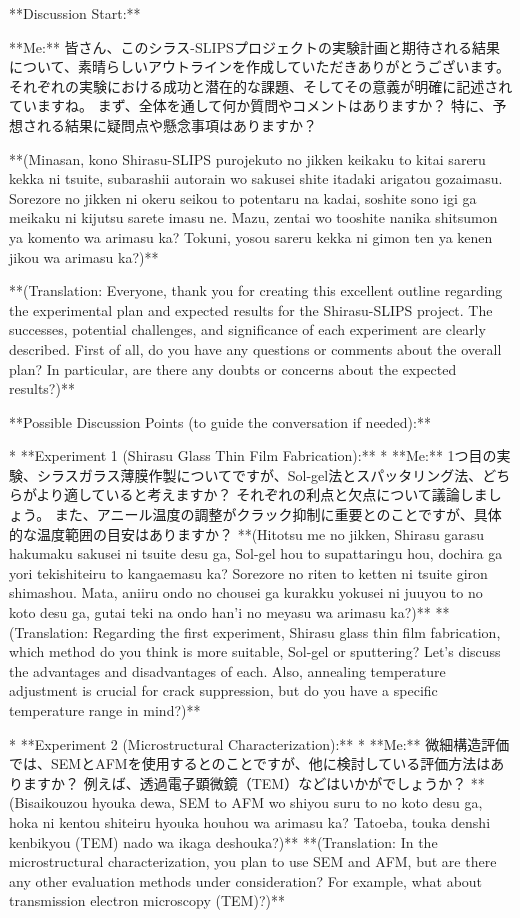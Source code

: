 \documentclass{article}
\begin{document}
**Discussion Start:**

**Me:** 皆さん、このシラス-SLIPSプロジェクトの実験計画と期待される結果について、素晴らしいアウトラインを作成していただきありがとうございます。それぞれの実験における成功と潜在的な課題、そしてその意義が明確に記述されていますね。 まず、全体を通して何か質問やコメントはありますか？ 特に、予想される結果に疑問点や懸念事項はありますか？

**(Minasan, kono Shirasu-SLIPS purojekuto no jikken keikaku to kitai sareru kekka ni tsuite, subarashii autorain wo sakusei shite itadaki arigatou gozaimasu. Sorezore no jikken ni okeru seikou to potentaru na kadai, soshite sono igi ga meikaku ni kijutsu sarete imasu ne. Mazu, zentai wo tooshite nanika shitsumon ya komento wa arimasu ka? Tokuni, yosou sareru kekka ni gimon ten ya kenen jikou wa arimasu ka?)**

**(Translation: Everyone, thank you for creating this excellent outline regarding the experimental plan and expected results for the Shirasu-SLIPS project. The successes, potential challenges, and significance of each experiment are clearly described. First of all, do you have any questions or comments about the overall plan? In particular, are there any doubts or concerns about the expected results?)**

**Possible Discussion Points (to guide the conversation if needed):**

*   **Experiment 1 (Shirasu Glass Thin Film Fabrication):**
    *   **Me:** 1つ目の実験、シラスガラス薄膜作製についてですが、Sol-gel法とスパッタリング法、どちらがより適していると考えますか？ それぞれの利点と欠点について議論しましょう。 また、アニール温度の調整がクラック抑制に重要とのことですが、具体的な温度範囲の目安はありますか？
        **(Hitotsu me no jikken, Shirasu garasu hakumaku sakusei ni tsuite desu ga, Sol-gel hou to supattaringu hou, dochira ga yori tekishiteiru to kangaemasu ka? Sorezore no riten to ketten ni tsuite giron shimashou. Mata, aniiru ondo no chousei ga kurakku yokusei ni juuyou to no koto desu ga, gutai teki na ondo han'i no meyasu wa arimasu ka?)**
        **(Translation: Regarding the first experiment, Shirasu glass thin film fabrication, which method do you think is more suitable, Sol-gel or sputtering? Let's discuss the advantages and disadvantages of each. Also, annealing temperature adjustment is crucial for crack suppression, but do you have a specific temperature range in mind?)**

*   **Experiment 2 (Microstructural Characterization):**
    *   **Me:** 微細構造評価では、SEMとAFMを使用するとのことですが、他に検討している評価方法はありますか？ 例えば、透過電子顕微鏡（TEM）などはいかがでしょうか？
        **(Bisaikouzou hyouka dewa, SEM to AFM wo shiyou suru to no koto desu ga, hoka ni kentou shiteiru hyouka houhou wa arimasu ka? Tatoeba, touka denshi kenbikyou (TEM) nado wa ikaga deshouka?)**
        **(Translation: In the microstructural characterization, you plan to use SEM and AFM, but are there any other evaluation methods under consideration? For example, what about transmission electron microscopy (TEM)?)**
\end{document}
